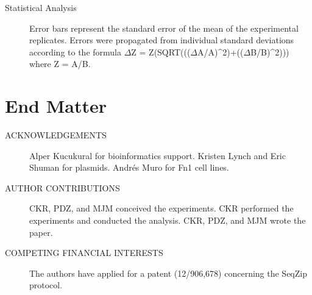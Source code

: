 \begin{description}
		\item[Statistical Analysis] 
		Error bars represent the standard error of the mean of the experimental replicates. Errors were propagated from individual standard deviations according to the formula $\Delta$Z = Z(SQRT((($\Delta$A/A)^2)+(($\Delta$B/B)^2))) where Z = A/B.

		\end{description}

\section{End Matter}
	\label{SeqZipPaper:sec:End Matter}

	\begin{description}

		\item[ACKNOWLEDGEMENTS] 
		Alper Kucukural for bioinformatics support. Kristen Lynch and Eric Shuman for plasmids. Andrés Muro for Fn1 cell lines. 

		\item[AUTHOR CONTRIBUTIONS] 
		CKR, PDZ, and MJM conceived the experiments. CKR performed the experiments and conducted the analysis. CKR, PDZ, and MJM wrote the paper. 

		\item[COMPETING FINANCIAL INTERESTS] 
		The authors have applied for a patent (12/906,678) concerning the SeqZip protocol. 

		\end{description}

\cleardoublepage